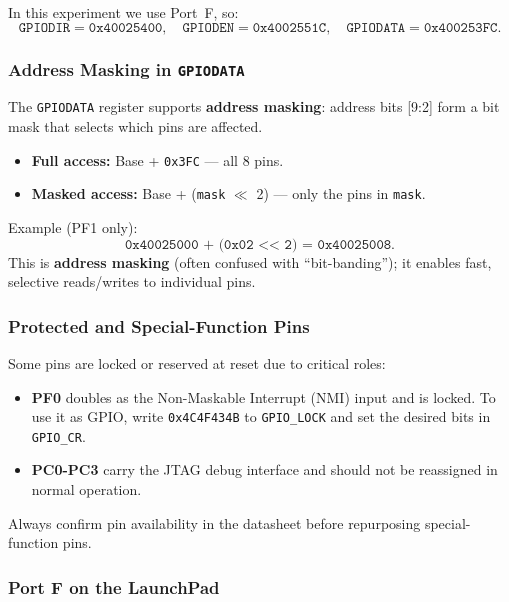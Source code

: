 \noindent
In this experiment we use Port~F, so:
\[
\texttt{GPIODIR} = \texttt{0x40025400},\quad
\texttt{GPIODEN} = \texttt{0x4002551C},\quad
\texttt{GPIODATA} = \texttt{0x400253FC}.
\]
\bigskip

\subsubsection{Address Masking in \texttt{GPIODATA}}

The \texttt{GPIODATA} register supports \textbf{address masking}: address bits [9:2] form a bit mask that selects which pins are affected.

\begin{itemize}[nosep]
  \item \textbf{Full access:} Base + \texttt{0x3FC} — all 8 pins.
  \item \textbf{Masked access:} Base + (\texttt{mask} $\ll$ 2) — only the pins in \texttt{mask}.
\end{itemize}

\noindent
Example (PF1 only):
\[
\texttt{0x40025000 + (0x02 << 2) = 0x40025008}.
\]
This is \textbf{address masking} (often confused with “bit-banding”); it enables fast, selective reads/writes to individual pins.
\bigskip

\subsubsection{Protected and Special-Function Pins}

Some pins are locked or reserved at reset due to critical roles:

\begin{itemize}[nosep]
  \item \textbf{PF0} doubles as the Non-Maskable Interrupt (NMI) input and is locked. To use it as GPIO, write \texttt{0x4C4F434B} to \texttt{GPIO\_LOCK} and set the desired bits in \texttt{GPIO\_CR}.
  \item \textbf{PC0-PC3} carry the JTAG debug interface and should not be reassigned in normal operation.
\end{itemize}

\noindent
Always confirm pin availability in the datasheet before repurposing special-function pins.
\bigskip

\subsubsection{Port F on the LaunchPad}


